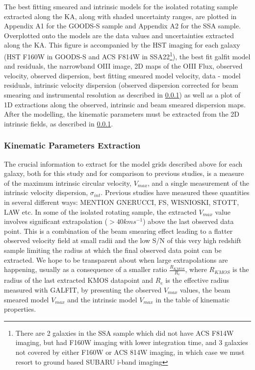 \documentclass[a4paper,fleqn,usenatbib]{mn2e}
\begin{document}
The best fitting smeared and intrinsic models for the isolated rotating sample extracted along the KA, along with shaded uncertainty ranges, are plotted in Appendix A1 for the GOODS-S sample and Appendix A2 for the SSA sample.
Overplotted onto the models are the data values and uncertainties extracted along the KA.
This figure is accompanied by the HST imaging for each galaxy (HST F160W in GOODS-S and ACS F814W in SSA22\footnote{There are 2 galaxies in the SSA sample which did not have ACS F814W imaging, but had F160W imaging with lower integration time, and 3 galaxies not covered by either F160W or ACS 814W imaging, in which case we must resort to ground based SUBARU i-band imaging}), the best fit galfit model and residuals, the narrowband OIII image, 2D maps of the OIII Flux, observed velocity, observed dispersion, best fitting smeared model velocity, data - model residuals, intrinsic velocity dispersion (observed dispersion corrected for beam smearing and instrumental resolution as described in \cref{subsubsec:param_extraction}) as well as a plot of 1D extractions along the observed, intrinsic and beam smeared dispersion maps.
After the modelling, the kinematic parameters must be extracted from the 2D intrinsic fields, as described in \cref{subsubsec:param_extraction}.   

\subsubsection{Kinematic Parameters Extraction}\label{subsubsec:param_extraction}
The crucial information to extract for the model grids described above for each galaxy, both for this study and for comparison to previous studies, is a measure of the maximum intrinsic circular velocity, $V_{max}$, and a single measurement of the intrinsic velocity dispersion, $\sigma_{int}$.
Previous studies have measured these quantities in several different ways:
MENTION GNERUCCI, FS, WISNIOSKI, STOTT, LAW etc. 
In some of the isolated rotating sample, the extracted $V_{max}$ value involves significant extrapolation ($> 40kms^{-1}$) above the last observed data point.
This is a combination of the beam smearing effect leading to a flatter observed velocity field at small radii and the low S/N of this very high redshift sample limiting the radius at which the final observed data point can be extracted.
We hope to be transparent about when large extrapolations are happening, usually as a consequence of a smaller ratio $\frac{R_{KMOS}}{R_{e}}$, where $R_{KMOS}$ is the radius of the last extracted KMOS datapoint and $R_{e}$ is the effective radius measured with GALFIT, by presenting the observed $V_{max}$ values, the beam smeared model $V_{max}$ and the intrinsic model $V_{max}$ in the table of kinematic properties.
\end{document}
